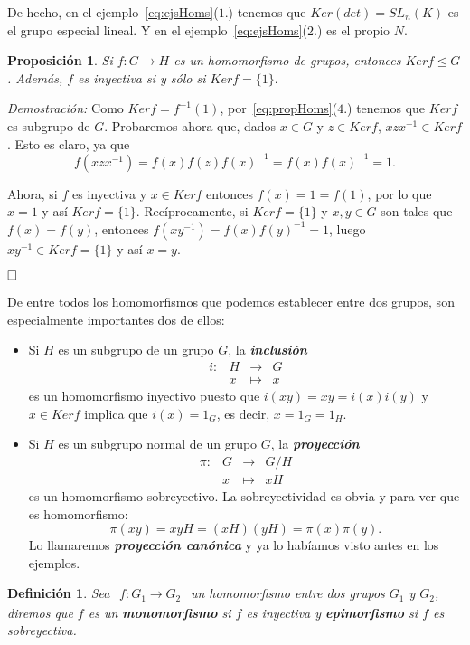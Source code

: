 \documentclass[12pt]{article}
\newtheorem{proposition}[theorem]{Proposición}
\newtheorem{definition}[theorem]{Definición}
\begin{document}
De hecho, en el ejemplo~\ref{eq:ejsHoms}($1.$) tenemos que $Ker(det) = SL_n(K)$ es el grupo especial lineal. Y en el ejemplo~\ref{eq:ejsHoms}($2.$) es el propio $N$.

\begin{proposition}Si $f \colon G \longrightarrow H$ es un homomorfismo de grupos, entonces $Ker f \unlhd G$. Además, $f$ es inyectiva si y sólo si $Ker f= \lbrace 1 \rbrace.$
\end{proposition}
\emph{Demostración: }Como $Ker f=f^{-1} (1)$, por~\ref{eq:propHoms}($4.$) tenemos que $Ker f$ es subgrupo de $G$. Probaremos ahora que, dados $x \in G$ y $z \in Ker f$, $xzx^{-1} \in Ker f$. Esto es claro, ya que $$f(xzx^{-1})=f(x)f(z)f(x)^{-1} = f(x)f(x)^{-1} = 1.$$

Ahora, si $f$ es inyectiva y $x \in Ker f$ entonces $f(x) = 1 = f(1)$, por lo que $x = 1$ y así $Ker f = \lbrace 1 \rbrace$. Recíprocamente, si $Ker f = \lbrace 1 \rbrace$ y $x,y \in G$ son tales que $f(x) = f(y)$, entonces $f(xy^{-1}) = f(x)f(y)^{-1} = 1$, luego $xy^{-1} \in Ker f = \lbrace 1 \rbrace$ y así $x=y$.

$\hfill \square$

De entre todos los homomorfismos que podemos establecer entre dos grupos, son especialmente importantes dos de ellos: 

\begin{itemize}
\item Si $H$ es un subgrupo de un grupo $G$, la \textbf{\textit{inclusión}} $$\begin{array}{rccl}
i \colon &H & \longrightarrow & G\\
&x & \longmapsto &x
\end{array}
$$ es un homomorfismo inyectivo puesto que $i(xy) = xy = i(x)i(y)$ y $x \in Ker f$ implica que $i(x) = 1_{G}$, es decir, $x = 1_{G} = 1_{H}$.
\item Si $H$ es un subgrupo normal de un grupo $G$, la \textbf{\textit{proyección}} $$\begin{array}{rccl}
\pi \colon &G & \longrightarrow & G/H\\
&x & \longmapsto &xH
\end{array}
$$ es un homomorfismo sobreyectivo. La sobreyectividad es obvia y para ver que es homomorfismo: $$\pi (xy) = xyH = (xH)(yH) = \pi (x) \pi (y).$$ Lo llamaremos \textbf{\textit{proyección canónica}} y ya lo habíamos visto antes en los ejemplos.
\end{itemize}

\begin{definition}Sea $
\begin{array}{rccl}
f\colon G_{1} \longrightarrow  G_{2}
\end{array}
$ un homomorfismo entre dos grupos $G_{1}$ y $G_{2}$, diremos que $f$ es un \textbf{monomorfismo} si $f$ es inyectiva y \textbf{epimorfismo} si $f$ es sobreyectiva.
\end{definition}
\end{document}

